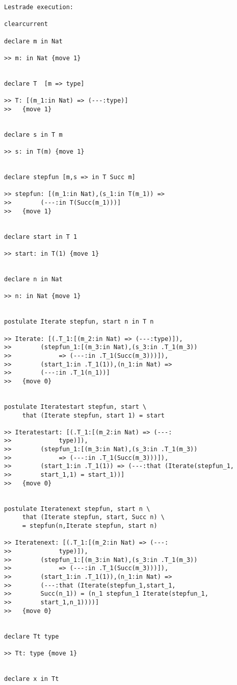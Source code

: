 \documentclass[12pt]{article}
\begin{document}
\begin{verbatim}Lestrade execution:

clearcurrent

declare m in Nat

>> m: in Nat {move 1}


declare T  [m => type]

>> T: [(m_1:in Nat) => (---:type)]
>>   {move 1}


declare s in T m

>> s: in T(m) {move 1}


declare stepfun [m,s => in T Succ m]

>> stepfun: [(m_1:in Nat),(s_1:in T(m_1)) => 
>>        (---:in T(Succ(m_1)))]
>>   {move 1}


declare start in T 1

>> start: in T(1) {move 1}


declare n in Nat

>> n: in Nat {move 1}


postulate Iterate stepfun, start n in T n

>> Iterate: [(.T_1:[(m_2:in Nat) => (---:type)]),
>>        (stepfun_1:[(m_3:in Nat),(s_3:in .T_1(m_3)) 
>>             => (---:in .T_1(Succ(m_3)))]),
>>        (start_1:in .T_1(1)),(n_1:in Nat) => 
>>        (---:in .T_1(n_1))]
>>   {move 0}


postulate Iteratestart stepfun, start \
     that (Iterate stepfun, start 1) = start

>> Iteratestart: [(.T_1:[(m_2:in Nat) => (---:
>>             type)]),
>>        (stepfun_1:[(m_3:in Nat),(s_3:in .T_1(m_3)) 
>>             => (---:in .T_1(Succ(m_3)))]),
>>        (start_1:in .T_1(1)) => (---:that (Iterate(stepfun_1,
>>        start_1,1) = start_1))]
>>   {move 0}


postulate Iteratenext stepfun, start n \
     that (Iterate stepfun, start, Succ n) \
     = stepfun(n,Iterate stepfun, start n)

>> Iteratenext: [(.T_1:[(m_2:in Nat) => (---:
>>             type)]),
>>        (stepfun_1:[(m_3:in Nat),(s_3:in .T_1(m_3)) 
>>             => (---:in .T_1(Succ(m_3)))]),
>>        (start_1:in .T_1(1)),(n_1:in Nat) => 
>>        (---:that (Iterate(stepfun_1,start_1,
>>        Succ(n_1)) = (n_1 stepfun_1 Iterate(stepfun_1,
>>        start_1,n_1))))]
>>   {move 0}


declare Tt type

>> Tt: type {move 1}


declare x in Tt


\end{verbatim}
\end{document}
